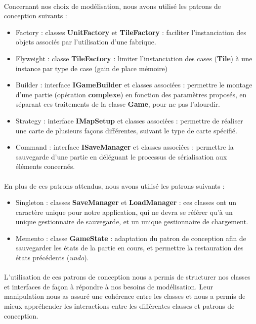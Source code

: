 \documentclass[a4paper]{article}
\begin{document}
\paragraph{}
Concernant nos choix de modélisation, nous avons utilisé les patrons de conception suivants :
\begin{itemize}
    \item Factory : classes \textbf{UnitFactory} et \textbf{TileFactory} : faciliter l'instanciation des objets associés par l'utilisation d'une fabrique.
    \item Flyweight : classe \textbf{TileFactory} : limiter l'instanciation des cases (\textbf{Tile}) à une instance par type de case (gain de place mémoire)
    \item Builder : interface \textbf{IGameBuilder} et classes associées : permettre le montage d'une partie (opération \textbf{complexe}) en fonction des paramètres proposés, en séparant ces traitements de la classe \textbf{Game}, pour ne pas l'alourdir.
    \item Strategy : interface \textbf{IMapSetup} et classes associées : permettre de réaliser une carte de plusieurs façons différentes, suivant le type de carte spécifié.
    \item Command : interface \textbf{ISaveManager} et classes associées : permettre la sauvegarde d'une partie en déléguant le processus de sérialisation aux éléments concernés.
\end{itemize}

\paragraph{}
En plus de ces patrons attendus, nous avons utilisé les patrons suivants :
\begin{itemize}
    \item Singleton : classes \textbf{SaveManager} et \textbf{LoadManager} : ces classes ont un caractère unique pour notre application, qui ne devra se référer qu'à un unique gestionnaire de sauvegarde, et un unique gestionnaire de chargement.
    \item Memento : classe \textbf{GameState} : adaptation du patron de conception afin de sauvegarder les états de la partie en cours, et permettre la restauration des états précédents (\textit{undo}).
\end{itemize}

\paragraph{}
L'utilisation de ces patrons de conception nous a permis de structurer nos classes et interfaces de façon à répondre à nos besoins de modélisation. Leur manipulation nous as assuré une cohérence entre les classes et nous a permis de mieux appréhender les interactions entre les différentes classes et patrons de conception.
\end{document}
